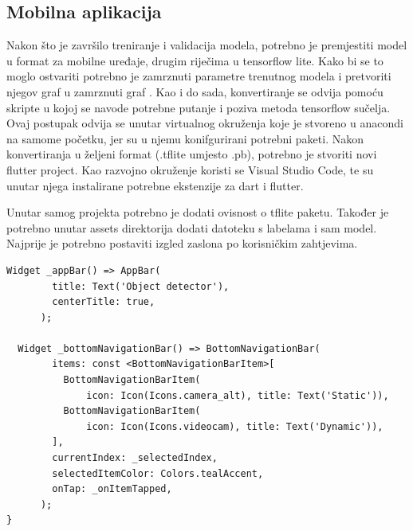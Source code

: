 \subsection{Mobilna aplikacija}
Nakon što je završilo treniranje i validacija modela, potrebno je premjestiti model u format za mobilne uređaje, drugim riječima u tensorflow lite. Kako bi se to moglo ostvariti potrebno je 
zamrznuti parametre trenutnog modela i pretvoriti njegov graf u zamrznuti graf . Kao i do sada, konvertiranje se odvija pomoću skripte u kojoj se navode potrebne putanje i poziva 
metoda tensorflow sučelja. Ovaj postupak odvija se unutar virtualnog okruženja koje je stvoreno u anacondi na samome početku, jer su u njemu konifgurirani potrebni paketi. Nakon konvertiranja u željeni format (.tflite umjesto .pb), potrebno 
je stvoriti novi flutter project. Kao razvojno okruženje koristi se Visual Studio Code, te su unutar njega instalirane potrebne ekstenzije za dart i flutter. 

Unutar samog projekta potrebno je dodati ovisnost  o tflite paketu. Također je potrebno unutar assets direktorija dodati datoteku s labelama i sam model. 
Najprije je potrebno postaviti izgled zaslona po korisničkim zahtjevima. 


\begin{lstlisting}[tabsize=2]
    Widget _appBar() => AppBar(
        title: Text('Object detector'),
        centerTitle: true,
      );

  Widget _bottomNavigationBar() => BottomNavigationBar(
        items: const <BottomNavigationBarItem>[
          BottomNavigationBarItem(
              icon: Icon(Icons.camera_alt), title: Text('Static')),
          BottomNavigationBarItem(
              icon: Icon(Icons.videocam), title: Text('Dynamic')),
        ],
        currentIndex: _selectedIndex,
        selectedItemColor: Colors.tealAccent,
        onTap: _onItemTapped,
      );
}

\end{lstlisting}
